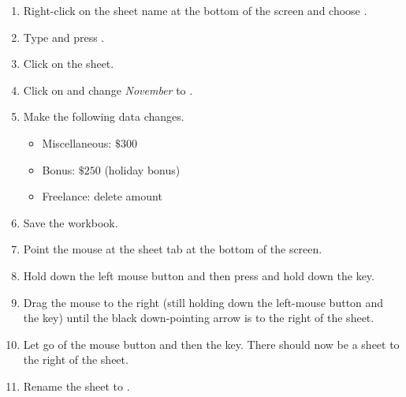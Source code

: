 \begin{enumerate}
	\item Right-click on the  sheet name at the bottom of the screen and choose .
	\item Type  and press .
	\item Click on the  sheet.
	\item Click on  and change \textit{November} to .
	\item Make the following data changes.

	\begin{itemize}
		\item Miscellaneous: $ \$300 $
		\item Bonus: $ \$250 $ (holiday bonus)
		\item Freelance: delete amount
	\end{itemize}

	\item Save the workbook.
	\item Point the mouse at the  sheet tab at the bottom of the screen.
	\item Hold down the left mouse button and then press and hold down the  key.
	\item Drag the mouse to the right (still holding down the left-mouse button and the  key) until the black down-pointing arrow is to the right of the  sheet.
	\item Let go of the mouse button and then the  key. There should now be a  sheet to the right of the  sheet.
	\item Rename the  sheet to .
\end{enumerate}

